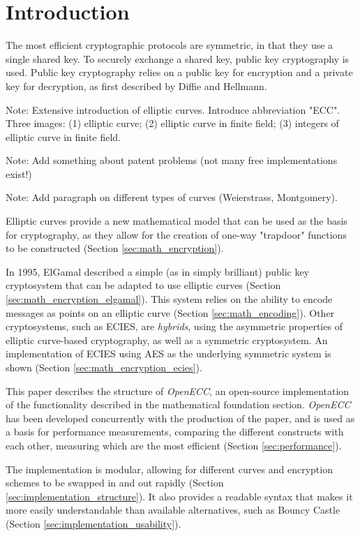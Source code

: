 \section{Introduction}

The most efficient cryptographic protocols are symmetric, in that they use a single shared key.
To securely exchange a shared key, public key cryptography is used. Public key cryptography
relies on a public key for encryption and a private key for decryption, as first described by
Diffie and Hellmann.

Note: Extensive introduction of elliptic curves. Introduce abbreviation "ECC". Three images:
(1) elliptic curve; (2) elliptic curve in finite field; (3) integers of elliptic curve in finite
field.

Note: Add something about patent problems (not many free implementations exist!)

Note: Add paragraph on different types of curves (Weierstrass, Montgomery).

Elliptic curves provide a new mathematical model that can be used as the basis for cryptography,
as they allow for the creation of one-way "trapdoor" functions to be constructed (Section
\ref{sec:math_encryption}).

In 1995, ElGamal described a simple (as in simply brilliant) public key cryptosystem that can be adapted
to use elliptic curves (Section \ref{sec:math_encryption_elgamal}). This system relies on the ability to
encode messages as points on an elliptic curve (Section \ref{sec:math_encoding}). Other cryptosystems,
such as ECIES, are \emph{hybrids}, using the asymmetric properties of elliptic curve-based cryptography,
as well as a symmetric cryptosystem. An implementation of ECIES using AES as the underlying symmetric
system is shown (Section \ref{sec:math_encryption_ecies}).

This paper describes the structure of \emph{OpenECC}, an open-source implementation of the functionality
described in the mathematical foundation section. \emph{OpenECC} has been developed concurrently with the
production of the paper, and is used as a basis for performance measurements, comparing the different constructs
with each other, measuring which are the most efficient (Section \ref{sec:performance}).

The implementation is modular, allowing for different curves and encryption schemes to be swapped in and out
rapidly (Section \ref{sec:implementation_structure}). It also provides a readable syntax that makes it more easily
understandable than available alternatives, such as Bouncy Castle (Section \ref{sec:implementation_usability}).

